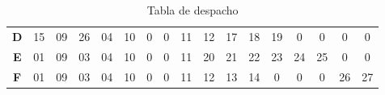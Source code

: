 \documentclass[12pt, twoside, openright]{report} %
\begin{document}
\begin{table}[H]
\begin{tabular}{ccccccccccccccccc}
  \multicolumn{1}{c|}{\textbf{D}} & \multicolumn{1}{c|}{15} & \multicolumn{1}{c|}{09} & \multicolumn{1}{c|}{26} & \multicolumn{1}{c|}{04} & \multicolumn{1}{c|}{10}                        & \multicolumn{1}{c|}{\cellcolor[HTML]{C0C0C0}0} & \multicolumn{1}{c|}{\cellcolor[HTML]{C0C0C0}0} & \multicolumn{1}{c|}{11}                        & \multicolumn{1}{c|}{12}                        & \multicolumn{1}{c|}{17}                        & \multicolumn{1}{c|}{18}                        & \multicolumn{1}{c|}{19}                        & \multicolumn{1}{c|}{\cellcolor[HTML]{C0C0C0}0} & \multicolumn{1}{c|}{\cellcolor[HTML]{C0C0C0}0} & \multicolumn{1}{c|}{\cellcolor[HTML]{C0C0C0}0} & \multicolumn{1}{c|}{\cellcolor[HTML]{C0C0C0}0} \\ \cline{2-17} 
  \multicolumn{1}{c|}{\textbf{E}} & \multicolumn{1}{c|}{01} & \multicolumn{1}{c|}{09} & \multicolumn{1}{c|}{03} & \multicolumn{1}{c|}{04} & \multicolumn{1}{c|}{10}                        & \multicolumn{1}{c|}{\cellcolor[HTML]{C0C0C0}0} & \multicolumn{1}{c|}{\cellcolor[HTML]{C0C0C0}0} & \multicolumn{1}{c|}{11}                        & \multicolumn{1}{c|}{20}                        & \multicolumn{1}{c|}{21}                        & \multicolumn{1}{c|}{22}                        & \multicolumn{1}{c|}{23}                        & \multicolumn{1}{c|}{24}                        & \multicolumn{1}{c|}{25}                        & \multicolumn{1}{c|}{\cellcolor[HTML]{C0C0C0}0} & \multicolumn{1}{c|}{\cellcolor[HTML]{C0C0C0}0} \\ \cline{2-17} 
  \multicolumn{1}{c|}{\textbf{F}} & \multicolumn{1}{c|}{01} & \multicolumn{1}{c|}{09} & \multicolumn{1}{c|}{03} & \multicolumn{1}{c|}{04} & \multicolumn{1}{c|}{10}                        & \multicolumn{1}{c|}{\cellcolor[HTML]{C0C0C0}0} & \multicolumn{1}{c|}{\cellcolor[HTML]{C0C0C0}0} & \multicolumn{1}{c|}{11}                        & \multicolumn{1}{c|}{12}                        & \multicolumn{1}{c|}{13}                        & \multicolumn{1}{c|}{14}                        & \multicolumn{1}{c|}{\cellcolor[HTML]{C0C0C0}0} & \multicolumn{1}{c|}{\cellcolor[HTML]{C0C0C0}0} & \multicolumn{1}{c|}{\cellcolor[HTML]{C0C0C0}0} & \multicolumn{1}{c|}{26}                        & \multicolumn{1}{c|}{27}                        \\ \cline{2-17} 
  \end{tabular}
  \caption{Tabla de despacho}
  \end{table}
    
\end{document}
